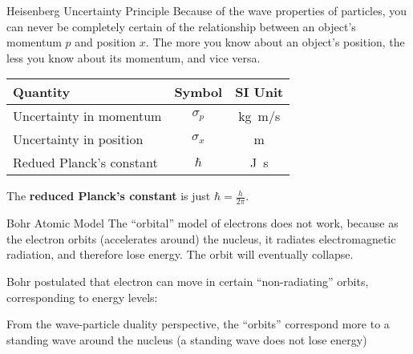 \documentclass[12pt,compress,aspectratio=169]{beamer}
\newcommand{\eq}[2]{\vspace{#1}{\Large\begin{displaymath}#2\end{displaymath}}}
\begin{document}
\begin{frame}{Heisenberg Uncertainty Principle}
  Because of the wave properties of particles, you can never be completely
  certain of the relationship between an object's momentum $p$ and position
  $x$. The more you know about an object's position, the less you know about
  its momentum, and vice versa.

  \eq{-.2in}{
    \boxed{\sigma_p\sigma_x\geq \frac{\hbar}{2}}
  }
  \begin{center}
    \begin{tabular}{l|c|c}
      \rowcolor{pink}
      \textbf{Quantity} & \textbf{Symbol} & \textbf{SI Unit} \\ \hline
      Uncertainty in momentum  & $\sigma_p$ & \si{\kilo\gram.\metre/\second}\\
      Uncertainty in position  & $\sigma_x$ & \si{\metre} \\
      Redued Planck's constant & $\hbar$    & \si{\joule\second}
    \end{tabular}
  \end{center}
  The \textbf{reduced Planck's constant} is just $\hbar=\frac{h}{2\pi}$.
\end{frame}




\begin{frame}{Bohr Atomic  Model}
  The ``orbital'' model of electrons does not work, because as the electron
  orbits (accelerates around) the nucleus, it radiates electromagnetic
  radiation, and therefore lose energy. The orbit will eventually collapse.

  \vspace{.1in} Bohr postulated that electron can move in certain
  ``non-radiating'' orbits, corresponding to energy levels:

  \eq{-.1in}{
    \boxed{E_n=-\frac{k^2e^4m}{2\hbar^2}\frac{Z^2}{n^2}}
  }
  
  From the wave-particle duality perspective, the ``orbits'' correspond more to
  a standing wave around the nucleus (a standing wave does not lose energy)
\end{frame}
\end{document}
